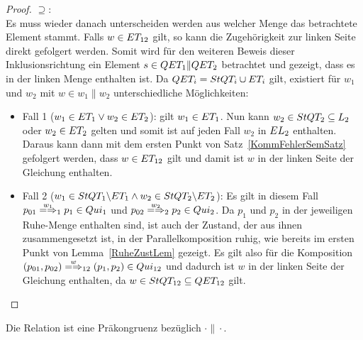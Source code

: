 \begin{proof}
  \glqq$\supseteq$\grqq{}:\\
  Es muss wieder danach unterscheiden werden aus welcher Menge das betrachtete
  Element stammt. Falls $w\in ET _{12}$ gilt, so kann die Zugehörigkeit zur
  linken Seite direkt gefolgert werden. Somit wird für den weiteren Beweis
  dieser Inklusionsrichtung ein Element $s\in QET _1\|QET _2$ betrachtet und
  gezeigt, dass es in der linken Menge enthalten ist. Da $QET _i=StQT _i\cup
  ET _i$ gilt, existiert für $w_1$ und $w_2$ mit $w\in w_1\|w_2$
  unterschiedliche Möglichkeiten:
  \begin{itemize}
    \item Fall 1 ($w_1\in ET _1\lor w_2\in ET _2$): \OBdA{} gilt $w_1\in ET
      _1$. Nun kann $w_2\in StQT _2\subseteq L_2$ oder $w_2\in ET _2$ gelten
      und somit ist auf jeden Fall $w_2$ in $EL _2$ enthalten. Daraus kann
      dann mit dem ersten Punkt von Satz~\ref{KommFehlerSemSatz} gefolgert
      werden, dass $w\in ET _{12}$ gilt und damit ist $w$ in der linken Seite
      der Gleichung enthalten.
    \item Fall 2 ($w_1\in StQT _1\backslash ET _1\land w_2\in StQT _2\backslash
      ET _2$): Es gilt in diesem Fall $p_{01} \weakmay[w_1]_1 p_1\in Qui_1$
      und $p_{02} \weakmay[w_2]_2 p_2\in Qui_2$. Da $p_1$ und $p_2$ in der
      jeweiligen Ruhe-Menge enthalten sind, ist auch der Zustand, der aus ihnen
      zusammengesetzt ist, in der Parallelkomposition ruhig, wie bereits im
      ersten Punkt von Lemma~\ref{RuheZustLem} gezeigt. Es gilt also für die
      Komposition $(p_{01},p_{02}) \weakmay[w]_{12} (p_1,p_2)\in Qui_{12}$ und
      dadurch ist $w$ in der linken Seite der Gleichung enthalten, da $w\in
      StQT _{12}\subseteq QET _{12}$ gilt.
  \end{itemize}
\end{proof}

\begin{Kor}
  \label{RuhePraekonKor}
  Die Relation \QRel{} ist eine Präkongruenz bezüglich $\cdot\|\cdot$.
\end{Kor}

